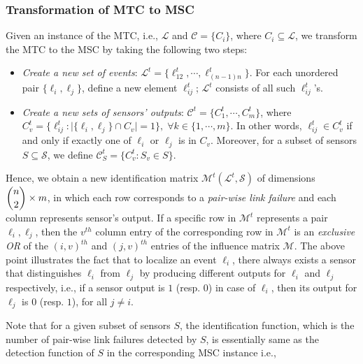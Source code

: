 \documentclass[twocolumn]{autart}
\begin{document}
\subsubsection{Transformation of MTC to MSC} \label{sec:t2s} \vspace{-0.35cm}
Given an instance of the MTC, i.e., $\mathcal{L}$ and $\mathcal{C}=\{C_i\}$, where $C_i\subseteq\mathcal{L}$, we transform the MTC to the MSC by taking the following two steps:
\begin{itemize}
\item \textit{Create a new set of events}: $\mathcal{L}^t= \{\ell^t_{12}, \cdots,\ell^t_{(n-1)n}\}$.
For each unordered pair $\{\ell_i,\ell_j\}$, define a new element $\ell_{ij}^t$; $\mathcal{L}^t$ consists of all such $\ell_{ij}^t$'s.
\item \textit{Create a new sets of sensors' outputs}: $\mathcal{C}^t =\{C_1^t,\cdots,C_m^t\}$, where $C_v^t = 
\{\ell_{ij}^t:\lvert\{\ell_i,\ell_j\}\cap C_v\rvert = 1\}, \;\forall k\in\{1,\cdots,m\}$. In other words, $\ell_{ij}^t\in C_v^t$ if and only if exactly one of $\ell_i$ or $\ell_j$ is in $C_v$. Moreover, for a subset of sensors $S\subseteq\mathcal{S}$, we define $\mathcal{C}^t_S = \{C^t_v: S_v\in S\}$.
\end{itemize}

Hence, we obtain a new identification matrix $\mathcal{M}^t(\mathcal{L}^t,\mathcal{S})$ of dimensions $\dbinom{n}{2}\times m$, in which each row corresponds to a \textit{pair-wise link failure} and each column represents sensor's output. If a specific row in $\mathcal{M}^t$ represents a pair $\ell_i,\ell_j$, then the $v^{th}$ column entry of the corresponding row in $\mathcal{M}^t$ is an \textit{exclusive OR} of the $(i,v)^{th}$ and $(j,v)^{th}$ entries of the influence matrix $\mathcal{M}$.
The above point illustrates the fact that to localize an event $\ell_i$, there always exists a sensor that distinguishes $\ell_i$ from $\ell_j$ by producing different outputs for $\ell_i$ and $\ell_j$ respectively, i.e., if a sensor output is $1$ (resp. $0$) in case of $\ell_i$, then its output for $\ell_j$ is $0$ (resp. $1$), for all $j\ne i$.  \vspace{-0.25cm}

Note that for a given subset of sensors $S$, the identification function, which is the number of pair-wise link failures detected by $S$, is essentially same as the detection function of $S$ in the corresponding MSC instance i.e., \vspace{-0.35cm}
\end{document}
